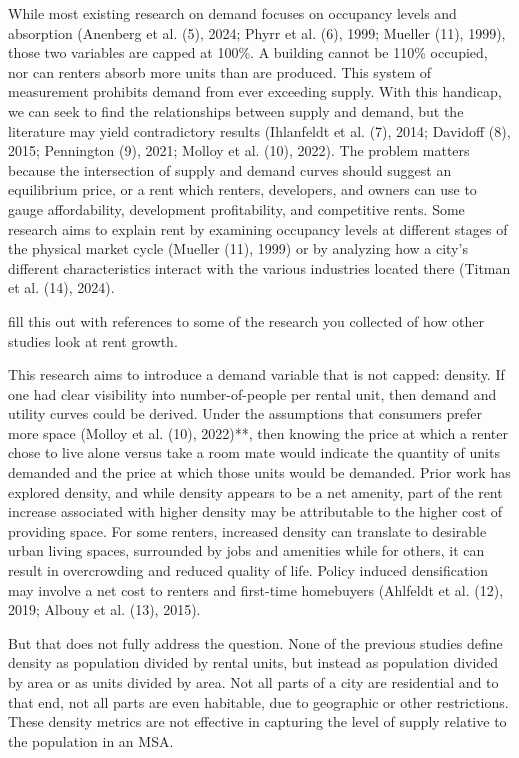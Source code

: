 \documentclass[sn-mathphys-num]{sn-jnl}%
\theoremstyle{thmstyleone}%
\theoremstyle{thmstyletwo}%
\theoremstyle{thmstylethree}%
\begin{document}
While most existing research on demand focuses on occupancy levels and absorption \cite{anenberg2024volatility}  (Anenberg et al. (5), 2024; Phyrr et al. (6), 1999; Mueller (11), 1999), those two variables are capped at 100\%. A building cannot be 110\% occupied, nor can renters absorb more units than are produced. This system of measurement prohibits demand from ever exceeding supply. With this handicap, we can seek to find the relationships between supply and demand, but the literature may yield contradictory results (Ihlanfeldt et al. (7), 2014; Davidoff (8), 2015; Pennington (9), 2021; Molloy et al. (10), 2022). The problem matters because the intersection of supply and demand curves should suggest an equilibrium price, or a rent which renters, developers, and owners can use to gauge affordability, development profitability, and competitive rents. Some research aims to explain rent by examining occupancy levels at different stages of the physical market cycle (Mueller (11), 1999) or by analyzing how a city’s different characteristics interact with the various industries located there (Titman et al. (14), 2024).   

fill this out with references to some of the research you collected of how other studies look at rent growth.  

   

This research aims to introduce a demand variable that is not capped: density. If one had clear visibility into number-of-people per rental unit, then demand and utility curves could be derived. Under the assumptions that consumers prefer more space (Molloy et al. (10), 2022)**, then knowing the price at which a renter chose to live alone versus take a room mate would indicate the quantity of units demanded and the price at which those units would be demanded. Prior work has explored density, and while density appears to be a net amenity, part of the rent increase associated with higher density may be attributable to the higher cost of providing space. For some renters, increased density can translate to desirable urban living spaces, surrounded by jobs and amenities while for others, it can result in overcrowding and reduced quality of life. Policy induced densification may involve a net cost to renters and first-time homebuyers (Ahlfeldt et al. (12), 2019; Albouy et al. (13), 2015). 

   

But that does not fully address the question. None of the previous studies define density as population divided by rental units, but instead as population divided by area or as units divided by area. Not all parts of a city are residential and to that end, not all parts are even habitable, due to geographic or other restrictions. These density metrics are not effective in capturing the level of supply relative to the population in an MSA.  
\end{document}
